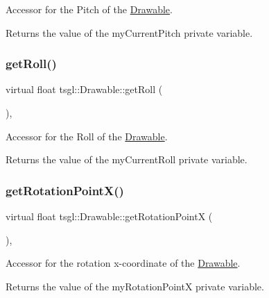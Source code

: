 Accessor for the Pitch of the \hyperlink{classtsgl_1_1_drawable}{Drawable}. 

Returns the value of the my\+Current\+Pitch private variable. \mbox{\label{classtsgl_1_1_drawable_a311c8e3530138a5d377981cb759d06f3}} 
\subsubsection{\texorpdfstring{get\+Roll()}{getRoll()}}
{\footnotesize\ttfamily virtual float tsgl\+::\+Drawable\+::get\+Roll (\begin{DoxyParamCaption}{ }\end{DoxyParamCaption})\hspace{0.3cm}{\ttfamily [inline]}, {\ttfamily [virtual]}}



Accessor for the Roll of the \hyperlink{classtsgl_1_1_drawable}{Drawable}. 

Returns the value of the my\+Current\+Roll private variable. \mbox{\label{classtsgl_1_1_drawable_a24835632306f5d78f4e4da96f48937da}} 
\subsubsection{\texorpdfstring{get\+Rotation\+Point\+X()}{getRotationPointX()}}
{\footnotesize\ttfamily virtual float tsgl\+::\+Drawable\+::get\+Rotation\+PointX (\begin{DoxyParamCaption}{ }\end{DoxyParamCaption})\hspace{0.3cm}{\ttfamily [inline]}, {\ttfamily [virtual]}}



Accessor for the rotation x-\/coordinate of the \hyperlink{classtsgl_1_1_drawable}{Drawable}. 

Returns the value of the my\+Rotation\+PointX private variable. \mbox{\label{classtsgl_1_1_drawable_a6a7876f0056f13aa3642c7beaf5949e3}} 
